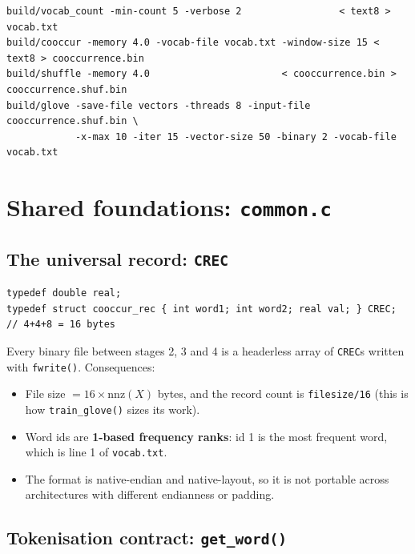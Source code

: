 \documentclass[11pt,a4paper]{article}
\newcommand{\file}[1]{\texttt{#1}}
\newcommand{\fn}[1]{\texttt{#1()}}
\begin{document}
\begin{lstlisting}[style=sh,caption={The canonical invocation (from \file{demo.sh}).}]
build/vocab_count -min-count 5 -verbose 2                 < text8 > vocab.txt
build/cooccur -memory 4.0 -vocab-file vocab.txt -window-size 15 < text8 > cooccurrence.bin
build/shuffle -memory 4.0                       < cooccurrence.bin > cooccurrence.shuf.bin
build/glove -save-file vectors -threads 8 -input-file cooccurrence.shuf.bin \
            -x-max 10 -iter 15 -vector-size 50 -binary 2 -vocab-file vocab.txt
\end{lstlisting}

\section{Shared foundations: \file{common.c}}

\subsection{The universal record: \texttt{CREC}}

\begin{lstlisting}
typedef double real;
typedef struct cooccur_rec { int word1; int word2; real val; } CREC;   // 4+4+8 = 16 bytes
\end{lstlisting}

Every binary file between stages 2, 3 and 4 is a headerless array of \texttt{CREC}s written
with \fn{fwrite}. Consequences:
\begin{itemize}[nosep]
  \item File size $= 16\times\text{nnz}(X)$ bytes, and the record count is
        \texttt{filesize/16} (this is how \fn{train\_glove} sizes its work).
  \item Word ids are \textbf{1-based frequency ranks}: id 1 is the most frequent word,
        which is line 1 of \file{vocab.txt}.
  \item The format is native-endian and native-layout, so it is not portable across
        architectures with different endianness or padding.
\end{itemize}

\subsection{Tokenisation contract: \fn{get\_word}}
\end{document}
